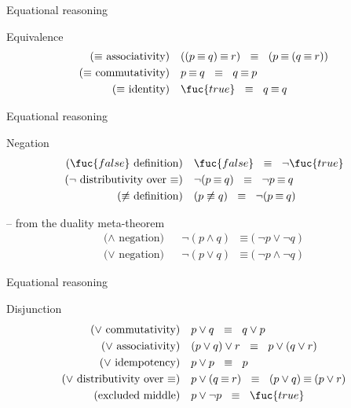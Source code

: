 \documentclass{beamer}
\def\true{\fuc{true}}
\def\false{\fuc{false}}
\def\dimp{\mathbin{\equiv}}
\def\e{\mathbin{\wedge}}
\def\ou{\mathbin{\vee}}
\begin{document}
\begin{slide}{Equational reasoning}
\begin{block}{Equivalence}
\begin{align*}
\text{($\dimp$ associativity)} && & ((p \dimp q) \dimp r) ~~\dimp~~ (p \dimp (q \dimp r))\\
\text{($\dimp$ commutativity)} &&  & p \dimp q ~~\dimp~~ q \dimp p \\
\text{($\dimp$ identity)} &&  & \true ~~\dimp~~ q \dimp q
\end{align*}
\end{block}
\end{slide} 


\begin{slide}{Equational reasoning}
\begin{block}{Negation}
\begin{align*}
\text{($\false$ definition)} && & \false ~~\dimp~~ \neg \true\\
\text{($\neg$ distributivity over $\dimp$)} &&  & \neg(p \dimp q) ~~\dimp~~ \neg p \dimp q\\
\text{($\not\equiv$ definition)} &&  & (p \not\equiv q) ~~\dimp~~ \neg(p \dimp q)
\end{align*}
\end{block}

\begin{block}{ -- from the duality meta-theorem}
\begin{align*}
\text{($\e$ negation)} && \neg (p \e q) &\dimp (\neg p \ou \neg q)
\\
\text{($\ou$ negation)} && \neg (p \ou q) &\dimp (\neg p \e \neg q)
\end{align*}
\end{block}
\end{slide} 

\begin{slide}{Equational reasoning}
\begin{block}{Disjunction}
\begin{align*}
\text{($\ou$ commutativity)} && & p \ou q ~~\dimp~~ q \ou p\\
\text{($\ou$ associativity)} && &(p \ou q) \ou r ~~\dimp~~ p\ou (q \ou r)\\
\text{($\ou$ idempotency)} && & p \ou p ~~\dimp~~ p\\
\text{($\ou$ distributivity over $\dimp$)} &&  & p \ou (q \dimp r) ~~\dimp~~ (p\ou q) \dimp (p \ou r)  \\
\text{(excluded middle)} &&  & p \ou \neg p ~~\dimp~~ \true
\end{align*}
\end{block}


\end{slide} 
\end{document}

